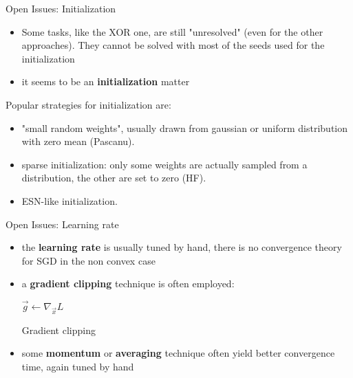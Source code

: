  
\begin{frame}{Open Issues: Initialization}
	
	\begin{itemize}
		\item Some tasks, like the XOR one, are still "unresolved" (even for the other approaches). They cannot be solved with most of the seeds used for the initialization
		\item it seems to be an \textbf{initialization} matter
	\end{itemize}
	
	Popular strategies for initialization are:
	\begin{itemize}
		\item "small random weights", usually drawn from gaussian or uniform distribution with zero mean (Pascanu). 
		\item sparse initialization: only some weights are actually sampled from a distribution, the other are set to zero (HF).
		\item ESN-like initialization.
	\end{itemize}
	
\end{frame}

\begin{frame}{Open Issues: Learning rate}
	
	\begin{itemize}	
		\item 	the \textbf{learning rate} is usually tuned by hand, there is no convergence theory for SGD in the non convex case
		\item a \textbf{gradient clipping} technique is often employed:
		\begin{algorithm}[H]
			$\vec{g} \gets \nabla_{\vec{x}} L$\\
			\caption{Gradient clipping}
			\label{algo:gradClipping}
		\end{algorithm}
		
		\item  some \textbf{momentum} or \textbf{averaging} technique often yield better convergence time, again tuned by hand
	\end{itemize}
	

\end{frame}